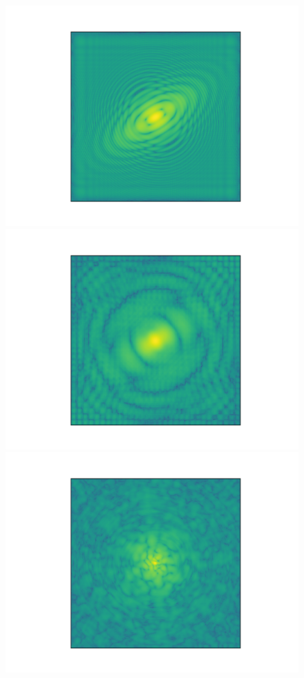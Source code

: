 \documentclass[a4paper,11pt]{article}
\begin{document}
\begin{figure}[!htb]
  \includegraphics[trim={3cm 0 0 0}, scale=0.5]{single_light_plane_1.png}
\endminipage\hfill
{}
  \includegraphics[trim={3cm 0 0 0},scale=0.5]{single_light_plane_7.png}
\endminipage\hfill
{}
  \includegraphics[trim={3cm 0 0 0},scale=0.5]{single_light_plane_107.png}

\end{figure}
\end{document}
